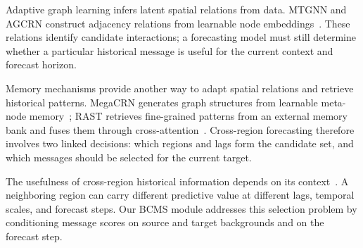 Adaptive graph learning infers latent spatial relations from data. MTGNN and AGCRN construct adjacency relations from learnable node embeddings~\cite{ref06,ref07}. These relations identify candidate interactions; a forecasting model must still determine whether a particular historical message is useful for the current context and forecast horizon.

Memory mechanisms provide another way to adapt spatial relations and retrieve historical patterns. MegaCRN generates graph structures from learnable meta-node memory~\cite{ref31}; RAST retrieves fine-grained patterns from an external memory bank and fuses them through cross-attention~\cite{ref23}. Cross-region forecasting therefore involves two linked decisions: which regions and lags form the candidate set, and which messages should be selected for the current target.

The usefulness of cross-region historical information depends on its context~\cite{ref46}. A neighboring region can carry different predictive value at different lags, temporal scales, and forecast steps. Our BCMS module addresses this selection problem by conditioning message scores on source and target backgrounds and on the forecast step.

